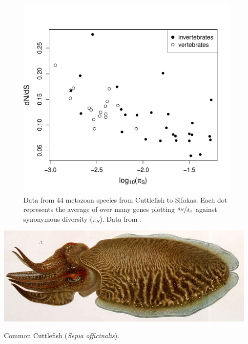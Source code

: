 {%



\begin{figure}
\begin{center}
\includegraphics[width=0.8 \textwidth]{Journal_figs/drift_selection/Galtier_dNdS/Galtier_dNdS.pdf}
\end{center}
\caption{Data from 44 metazoan species from Cuttlefish to Sifakas. Each dot represents the
  average of over many genes plotting $\nicefrac{d_N}{d_S}$ against synonymous
  diversity ($\pi_S$). Data from \citet{galtier2016adaptive}.  } \label{Galtier_dNdS}
\end{figure}

\begin{marginfigure}
\begin{center}\includegraphics[width= \textwidth]{illustration_images/Genetic_drift_selection/Cuttlefish/Cuttlefish.jpg}
\end{center}
\caption{Common Cuttlefish ({\it Sepia officinalis}).  } \label{Cuttlefish}
\end{marginfigure}


}
